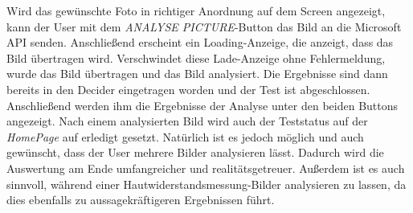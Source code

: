 Wird das gewünschte Foto in richtiger Anordnung auf dem Screen angezeigt, kann der User mit dem \textit{ANALYSE PICTURE}-Button das Bild an die Microsoft API senden. Anschließend erscheint ein Loading-Anzeige, die anzeigt, dass das Bild übertragen wird. Verschwindet diese Lade-Anzeige ohne Fehlermeldung, wurde das Bild übertragen und das Bild analysiert. Die Ergebnisse sind dann bereits in den Decider eingetragen worden und der Test ist abgeschlossen. Anschließend werden ihm die Ergebnisse der Analyse unter den beiden Buttons angezeigt. Nach einem analysierten Bild wird auch der Teststatus auf der \textit{HomePage} auf erledigt gesetzt. Natürlich ist es jedoch möglich und auch gewünscht, dass der User mehrere Bilder analysieren lässt. Dadurch wird die Auswertung am Ende umfangreicher und realitätsgetreuer. Außerdem ist es auch sinnvoll, während einer Hautwiderstandsmessung-Bilder analysieren zu lassen, da dies ebenfalls zu aussagekräftigeren Ergebnissen führt.
